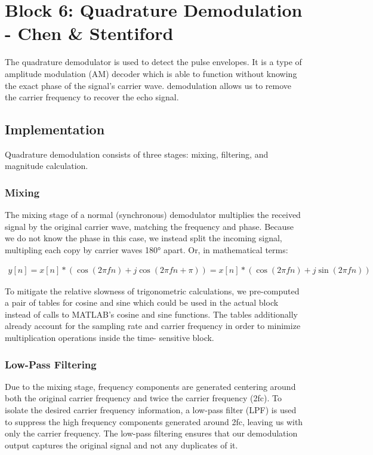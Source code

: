 
\section{Block 6: Quadrature Demodulation - Chen \& Stentiford}

The quadrature demodulator is used to detect the pulse envelopes. It is a type of 
amplitude modulation (AM) decoder which is able to function without knowing the exact 
phase of the signal's carrier wave. demodulation allows us to remove the carrier frequency
to recover the echo signal.

\subsection{Implementation}

Quadrature demodulation consists of three stages: mixing, filtering, and magnitude calculation.

\subsubsection{Mixing}

The mixing stage of a normal (synchronous) demodulator multiplies the received signal 
by the original carrier wave, matching the frequency and phase. Because we do not know 
the phase in this case, we instead split the incoming signal, multipling each copy by 
carrier waves 180° apart. Or, in mathematical terms:

\begin{align*}
    y[n] = x[n]*(\cos(2 \pi f n)+j \cos(2 \pi f n+\pi)) = x[n]*(\cos(2 \pi f n)+j \sin(2 \pi f n))
\end{align*}


To mitigate the relative slowness of trigonometric calculations, we pre-computed a pair of 
tables for cosine and sine which could be used in the actual block instead of calls to 
MATLAB's cosine and sine functions. The tables additionally already account for the sampling 
rate and carrier frequency in order to minimize multiplication operations inside the time-
sensitive block.

\subsubsection{Low-Pass Filtering}

Due to the mixing stage, frequency components are generated centering around both the original
carrier frequency and twice the carrier frequency (2fc). To isolate the desired carrier
frequency information, a low-pass filter (LPF) is used to suppress the high frequency components
generated around 2fc, leaving us with only the carrier frequency. The low-pass filtering ensures
that our demodulation output captures the original signal and not any duplicates of it.

